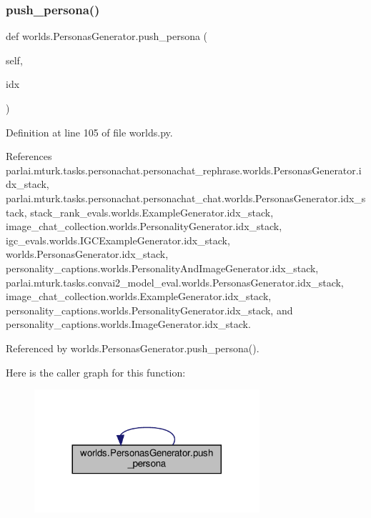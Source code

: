 \subsubsection{\texorpdfstring{push\+\_\+persona()}{push\_persona()}\hspace{0.1cm}{\footnotesize\ttfamily [2/2]}}
{\footnotesize\ttfamily def worlds.\+Personas\+Generator.\+push\+\_\+persona (\begin{DoxyParamCaption}\item[{}]{self,  }\item[{}]{idx }\end{DoxyParamCaption})}



Definition at line 105 of file worlds.\+py.



References parlai.\+mturk.\+tasks.\+personachat.\+personachat\+\_\+rephrase.\+worlds.\+Personas\+Generator.\+idx\+\_\+stack, parlai.\+mturk.\+tasks.\+personachat.\+personachat\+\_\+chat.\+worlds.\+Personas\+Generator.\+idx\+\_\+stack, stack\+\_\+rank\+\_\+evals.\+worlds.\+Example\+Generator.\+idx\+\_\+stack, image\+\_\+chat\+\_\+collection.\+worlds.\+Personality\+Generator.\+idx\+\_\+stack, igc\+\_\+evals.\+worlds.\+I\+G\+C\+Example\+Generator.\+idx\+\_\+stack, worlds.\+Personas\+Generator.\+idx\+\_\+stack, personality\+\_\+captions.\+worlds.\+Personality\+And\+Image\+Generator.\+idx\+\_\+stack, parlai.\+mturk.\+tasks.\+convai2\+\_\+model\+\_\+eval.\+worlds.\+Personas\+Generator.\+idx\+\_\+stack, image\+\_\+chat\+\_\+collection.\+worlds.\+Example\+Generator.\+idx\+\_\+stack, personality\+\_\+captions.\+worlds.\+Personality\+Generator.\+idx\+\_\+stack, and personality\+\_\+captions.\+worlds.\+Image\+Generator.\+idx\+\_\+stack.



Referenced by worlds.\+Personas\+Generator.\+push\+\_\+persona().

Here is the caller graph for this function\+:
\nopagebreak
\begin{figure}[H]
\begin{center}
\leavevmode
\includegraphics[width=236pt]{classworlds_1_1PersonasGenerator_acc8e5aeffdb815f8ca89af167cf8062e_icgraph}
\end{center}
\end{figure}
\mbox{\label{classworlds_1_1PersonasGenerator_a5a71b02bc024659c63d0f5416de64fe8}} 
